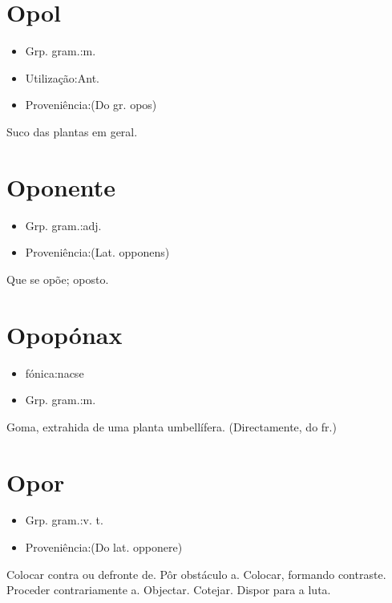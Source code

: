 \section{Opol}
\begin{itemize}
\item {Grp. gram.:m.}
\end{itemize}
\begin{itemize}
\item {Utilização:Ant.}
\end{itemize}
\begin{itemize}
\item {Proveniência:(Do gr. \textunderscore opos\textunderscore )}
\end{itemize}
Suco das plantas em geral.
\section{Oponente}
\begin{itemize}
\item {Grp. gram.:adj.}
\end{itemize}
\begin{itemize}
\item {Proveniência:(Lat. \textunderscore opponens\textunderscore )}
\end{itemize}
Que se opõe; oposto.
\section{Opopónax}
\begin{itemize}
\item {fónica:nacse}
\end{itemize}
\begin{itemize}
\item {Grp. gram.:m.}
\end{itemize}
Goma, extrahida de uma planta umbellífera.
(Directamente, do fr.)
\section{Opor}
\begin{itemize}
\item {Grp. gram.:v. t.}
\end{itemize}
\begin{itemize}
\item {Proveniência:(Do lat. \textunderscore opponere\textunderscore )}
\end{itemize}
Colocar contra ou defronte de.
Pôr obstáculo a.
Colocar, formando contraste.
Proceder contrariamente a.
Objectar.
Cotejar.
Dispor para a luta.
